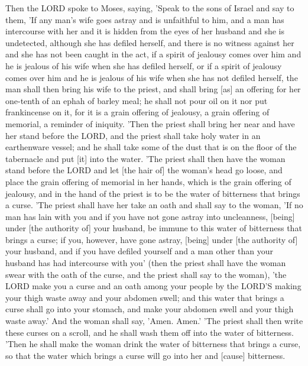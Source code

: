 \begin{scripture}[Numbers 5:11-31]
    Then the LORD spoke to Moses, saying,
    'Speak to the sons of Israel and say to them, 'If any man's wife goes astray and is unfaithful to him,
    and a man has intercourse with her and it is hidden from the eyes of her husband and she is undetected, although she has defiled herself, and there is no witness against her and she has not been caught in the act,
    if a spirit of jealousy comes over him and he is jealous of his wife when she has defiled herself, or if a spirit of jealousy comes over him and he is jealous of his wife when she has not defiled herself,
    the man shall then bring his wife to the priest, and shall bring [as] an offering for her one-tenth of an ephah of barley meal; he shall not pour oil on it nor put frankincense on it, for it is a grain offering of jealousy, a grain offering of memorial, a reminder of iniquity.
    'Then the priest shall bring her near and have her stand before the LORD,
    and the priest shall take holy water in an earthenware vessel; and he shall take some of the dust that is on the floor of the tabernacle and put [it] into the water.
    'The priest shall then have the woman stand before the LORD and let [the hair of] the woman's head go loose, and place the grain offering of memorial in her hands, which is the grain offering of jealousy, and in the hand of the priest is to be the water of bitterness that brings a curse.
    'The priest shall have her take an oath and shall say to the woman, 'If no man has lain with you and if you have not gone astray into uncleanness, [being] under [the authority of] your husband, be immune to this water of bitterness that brings a curse;
    if you, however, have gone astray, [being] under [the authority of] your husband, and if you have defiled yourself and a man other than your husband has had intercourse with you'
    (then the priest shall have the woman swear with the oath of the curse, and the priest shall say to the woman), 'the LORD make you a curse and an oath among your people by the LORD'S making your thigh waste away and your abdomen swell;
    and this water that brings a curse shall go into your stomach, and make your abdomen swell and your thigh waste away.' And the woman shall say, 'Amen. Amen.'
    'The priest shall then write these curses on a scroll, and he shall wash them off into the water of bitterness.
    'Then he shall make the woman drink the water of bitterness that brings a curse, so that the water which brings a curse will go into her and [cause] bitterness.

\end{scripture}
